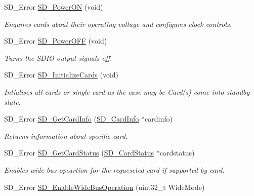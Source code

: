 \begin{DoxyCompactItemize}
S\+D\+\_\+\+Error \hyperlink{group___s_t_m324x_g___e_v_a_l___s_d_i_o___s_d___private___functions_ga9fbd4dd6187701cbe286ddb163e9c312}{S\+D\+\_\+\+Power\+ON} (void)
\begin{DoxyCompactList}\small\item\em Enquires cards about their operating voltage and configures clock controls. \end{DoxyCompactList}\item 
S\+D\+\_\+\+Error \hyperlink{group___s_t_m324x_g___e_v_a_l___s_d_i_o___s_d___private___functions_ga9f053c27018521095d7333e7df238764}{S\+D\+\_\+\+Power\+O\+FF} (void)
\begin{DoxyCompactList}\small\item\em Turns the S\+D\+IO output signals off. \end{DoxyCompactList}\item 
S\+D\+\_\+\+Error \hyperlink{group___s_t_m324x_g___e_v_a_l___s_d_i_o___s_d___private___functions_gab39f671413ee824a13bf1bd833f724e9}{S\+D\+\_\+\+Initialize\+Cards} (void)
\begin{DoxyCompactList}\small\item\em Intialises all cards or single card as the case may be Card(s) come into standby state. \end{DoxyCompactList}\item 
S\+D\+\_\+\+Error \hyperlink{group___s_t_m324x_g___e_v_a_l___s_d_i_o___s_d___private___functions_ga5348c3c8f17f8c704bf00f1c5e21549d}{S\+D\+\_\+\+Get\+Card\+Info} (\hyperlink{struct_s_d___card_info}{S\+D\+\_\+\+Card\+Info} $\ast$cardinfo)
\begin{DoxyCompactList}\small\item\em Returns information about specific card. \end{DoxyCompactList}\item 
S\+D\+\_\+\+Error \hyperlink{group___s_t_m324x_g___e_v_a_l___s_d_i_o___s_d___private___functions_ga858e0742dd01b2e2f6f397d30de6428f}{S\+D\+\_\+\+Get\+Card\+Status} (\hyperlink{struct_s_d___card_status}{S\+D\+\_\+\+Card\+Status} $\ast$cardstatus)
\begin{DoxyCompactList}\small\item\em Enables wide bus opeartion for the requeseted card if supported by card. \end{DoxyCompactList}\item 
S\+D\+\_\+\+Error \hyperlink{group___s_t_m324x_g___e_v_a_l___s_d_i_o___s_d___private___functions_ga6569e73a229e639d2043549942d58d11}{S\+D\+\_\+\+Enable\+Wide\+Bus\+Operation} (uint32\+\_\+t Wide\+Mode)

\end{DoxyCompactItemize}
